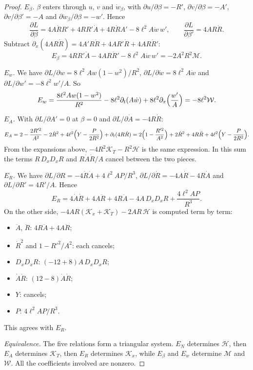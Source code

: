\begin{proof}
\emph{$E_\beta$.} $\beta$ enters through $u$, $v$ and $\dot w_\beta$, with $\partial u/\partial\beta=-R'$, $\partial v/\partial\beta=-A'$, $\partial v/\partial\beta'=-A$ and $\partial\dot w_\beta/\partial\beta=-w'$. Hence
\[
\frac{\partial L}{\partial\beta}=4A\dot RR'+4RR'\dot A+4R\dot RA'-8\ell^2A\dot w\,w',\qquad\frac{\partial L}{\partial\beta'}=4AR\dot R .
\]
Subtract $\partial_x(4AR\dot R)=4A'R\dot R+4AR'\dot R+4AR\dot R'$:
\[
E_\beta=4RR'\dot A-4AR\dot R'-8\ell^2A\dot w\,w'=-2A^2R^2\mathcal M .
\]

\emph{$E_w$.} We have $\partial L/\partial w=8\ell^2Aw(1-w^2)/R^2$, $\partial L/\partial\dot w=8\ell^2A\dot w$ and $\partial L/\partial w'=-8\ell^2w'/A$. So
\[
E_w=\frac{8\ell^2Aw(1-w^2)}{R^2}-8\ell^2\partial_t(A\dot w)+8\ell^2\partial_x\Bigl(\frac{w'}A\Bigr)=-8\ell^2\mathcal W .
\]

\emph{$E_A$.} With $\partial L/\partial A'=0$ at $\beta=0$ and $\partial L/\partial\dot A=-4R\dot R$:
\[
E_A=2-\frac{2R'^2}{A^2}-2\dot R^2+4\ell^2\Bigl(Y-\frac P{2R^2}\Bigr)+\partial_t(4R\dot R)=2\Bigl(1-\frac{R'^2}{A^2}\Bigr)+2\dot R^2+4R\ddot R+4\ell^2\Bigl(Y-\frac P{2R^2}\Bigr).
\]
From the expansions above, $-4R^2\mathcal K_T-R^2\mathcal H$ is the same expression. In this sum the terms $R\,D_xD_xR$ and $R\dot A\dot R/A$ cancel between the two pieces.

\emph{$E_R$.} We have $\partial L/\partial R=-4\dot R\dot A+4\ell^2AP/R^3$, $\partial L/\partial\dot R=-4A\dot R-4R\dot A$ and $\partial L/\partial R'=4R'/A$. Hence
\[
E_R=4\dot A\dot R+4A\ddot R+4R\ddot A-4A\,D_xD_xR+\frac{4\ell^2AP}{R^3}.
\]
On the other side, $-4AR(\mathcal K_x+\mathcal K_T)-2AR\,\mathcal H$ is computed term by term:
\begin{itemize}[nosep]
\item $\ddot A$, $\ddot R$: $4R\ddot A+4A\ddot R$;
\item $\dot R^2$ and $1-R'^2/A^2$: each cancels;
\item $D_xD_xR$: $(-12+8)A\,D_xD_xR$;
\item $\dot A\dot R$: $(12-8)\dot A\dot R$;
\item $Y$: cancels;
\item $P$: $4\ell^2AP/R^3$.
\end{itemize}
This agrees with $E_R$.

\emph{Equivalence.} The five relations form a triangular system. $E_N$ determines $\mathcal H$, then $E_A$ determines $\mathcal K_T$, then $E_R$ determines $\mathcal K_x$, while $E_\beta$ and $E_w$ determine $\mathcal M$ and $\mathcal W$. All the coefficients involved are nonzero.
\end{proof}


